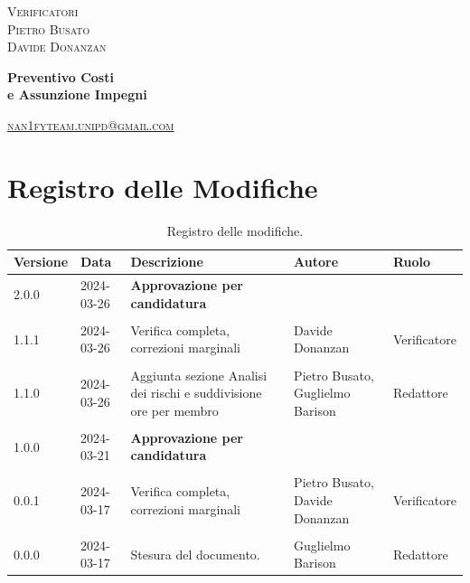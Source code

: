 \documentclass[8pt]{article}
\begin{document}
\begin{titlepage}
\begin{minipage}[t]{0.47\textwidth}
		{\large{\textsc{Verificatori}}
			\vspace{3mm}
			{\\\large{\textsc{Pietro Busato}\\}} %
			{\large{\textsc{Davide Donanzan}}}
			
		}
		\vspace{4mm}\vspace{4mm}
	\end{minipage}
	\vspace{4cm}
	\begin{center}
		\begin{flushright}
			{\fontsize{30pt}{52pt}\selectfont \textbf{Preventivo Costi \\e Assunzione Impegni\\}} %
		\end{flushright}
		\vspace{3cm}
	\end{center}
	\vspace{8.5 cm}
	{\small \textsc{\href{mailto: nan1fyteam.unipd@gmail.com}{nan1fyteam.unipd@gmail.com}}}
\end{titlepage}
\pagestyle{mystyle}
\section*{Registro delle Modifiche}
\begin{table}[ht!]	
	\centering
	\begin{tabular}{p{1.2cm} p{2cm} p{6cm} p{3cm} p{2cm}}
		\toprule
		\textbf{Versione}& \textbf{Data} & \textbf{Descrizione} & \textbf{Autore} & \textbf{Ruolo} \\
		\midrule
		2.0.0 & 2024-03-26 & \textbf{Approvazione per candidatura} & &  \\\\
		1.1.1 & 2024-03-26 & Verifica completa, correzioni marginali & Davide Donanzan & Verificatore \\\\
		1.1.0 & 2024-03-26 & Aggiunta sezione Analisi dei rischi e suddivisione ore per membro & Pietro Busato, Guglielmo Barison & Redattore \\\\
		1.0.0 & 2024-03-21 & \textbf{Approvazione per candidatura} & &  \\\\
		0.0.1 & 2024-03-17 & Verifica completa, correzioni marginali  & Pietro Busato, Davide Donanzan & Verificatore \\\\
		0.0.0 & 2024-03-17 & Stesura del documento.  & Guglielmo Barison & Redattore \\
		\bottomrule
	\end{tabular}
	\caption{Registro delle modifiche.}
	\label{table:Registro delle modifiche}
\end{table}
\newpage
\tableofcontents
\clearpage
\newpage
\justifying
\end{document}
